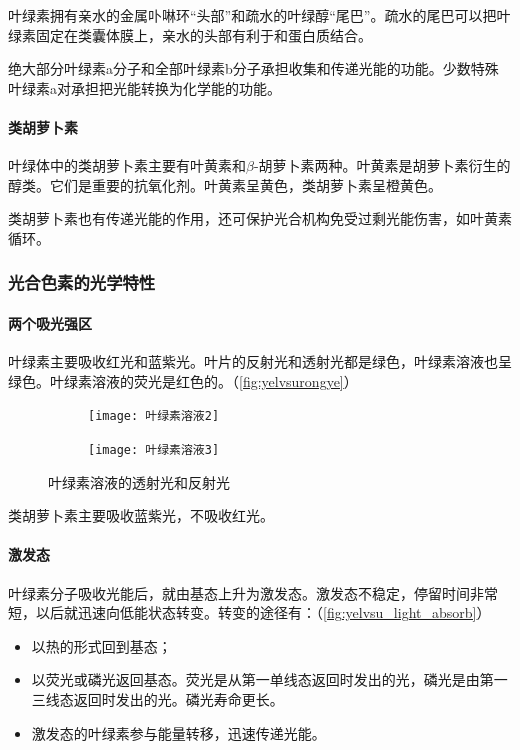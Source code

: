 叶绿素拥有亲水的金属卟啉环“头部”和疏水的叶绿醇“尾巴”。疏水的尾巴可以把叶绿素固定在类囊体膜上，亲水的头部有利于和蛋白质结合。

绝大部分叶绿素a分子和全部叶绿素b分子承担收集和传递光能的功能。少数特殊叶绿素a对承担把光能转换为化学能的功能。

\paragraph{类胡萝卜素}

叶绿体中的类胡萝卜素主要有叶黄素和$\beta$-胡萝卜素两种。叶黄素是胡萝卜素衍生的醇类。它们是重要的抗氧化剂。叶黄素呈黄色，类胡萝卜素呈橙黄色。

类胡萝卜素也有传递光能的作用，还可保护光合机构免受过剩光能伤害，如叶黄素循环。

\subsubsection{光合色素的光学特性}

\paragraph{两个吸光强区}

叶绿素主要吸收红光和蓝紫光。叶片的反射光和透射光都是绿色，叶绿素溶液也呈绿色。叶绿素溶液的荧光是红色的。（\autoref{fig:yelvsurongye}）

\begin{figure}[htbp]
	\centering
	\begin{subfigure}{0.45\textwidth}
		\texttt{[image: 叶绿素溶液2]}
	\end{subfigure}
	\hfill
	\begin{subfigure}{0.45\textwidth}
		\texttt{[image: 叶绿素溶液3]}
	\end{subfigure}
	\caption{叶绿素溶液的透射光和反射光}
	\label{fig:yelvsurongye}
\end{figure}


类胡萝卜素主要吸收蓝紫光，不吸收红光。

\paragraph{激发态}

叶绿素分子吸收光能后，就由基态上升为激发态。激发态不稳定，停留时间非常短，以后就迅速向低能状态转变。转变的途径有：（\autoref{fig:yelvsu_light_absorb}）
\begin{itemize}
	\item 以热的形式回到基态；
	\item 以荧光或磷光返回基态。荧光是从第一单线态返回时发出的光，磷光是由第一三线态返回时发出的光。磷光寿命更长。
	\item 激发态的叶绿素参与能量转移，迅速传递光能。
\end{itemize}

